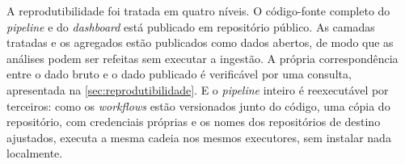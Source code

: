 A reprodutibilidade foi tratada em quatro níveis. O código-fonte completo do \textit{pipeline} e do \textit{dashboard} está publicado em repositório público. As camadas tratadas e os agregados estão publicados como dados abertos, de modo que as análises podem ser refeitas sem executar a ingestão. A própria correspondência entre o dado bruto e o dado publicado é verificável por uma consulta, apresentada na \autoref{sec:reprodutibilidade}. E o \textit{pipeline} inteiro é reexecutável por terceiros: como os \textit{workflows} estão versionados junto do código, uma cópia do repositório, com credenciais próprias e os nomes dos repositórios de destino ajustados, executa a mesma cadeia nos mesmos executores, sem instalar nada localmente.
